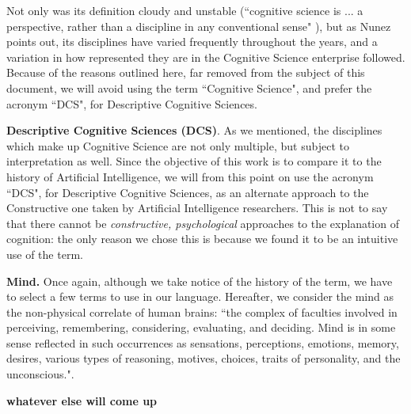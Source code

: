 \documentclass[../main.tex]{subfiles}
\begin{document}
Not only was its definition cloudy and unstable (``cognitive science is ... a perspective, rather than a discipline in any conventional sense" \cite{sheehyCognitiveScience1995}), but as Nunez points out, its disciplines have varied frequently throughout the years, and a variation in how represented they are in the Cognitive Science enterprise followed. Because of the reasons outlined here, far removed from the subject of this document, we will avoid using the term ``Cognitive Science", and prefer the acronym ``DCS", for Descriptive Cognitive Sciences.

\vspace{5pt}
\textbf{Descriptive Cognitive Sciences (DCS)}. As we mentioned, the disciplines which make up Cognitive Science are not only multiple, but subject to interpretation as well. Since the objective of this work is to compare it to the history of Artificial Intelligence, we will from this point on use the acronym ``DCS", for Descriptive Cognitive Sciences, as an alternate approach to the Constructive one taken by Artificial Intelligence researchers. This is not to say that there cannot be \textit{constructive, psychological} approaches to the explanation of cognition: the only reason we chose this is because we found it to be an intuitive use of the term.

\vspace{5pt}
\textbf{Mind.} Once again, although we take notice of the history of the term, we have to select a few terms to use in our language. Hereafter, we consider the mind as the non-physical correlate of human brains: ``the complex of faculties involved in perceiving, remembering, considering, evaluating, and deciding. Mind is in some sense reflected in such occurrences as sensations, perceptions, emotions, memory, desires, various types of reasoning, motives, choices, traits of personality, and the unconscious."\cite{Mind}.

\vspace{5pt}
\textbf{whatever else will come up}
\end{document}

